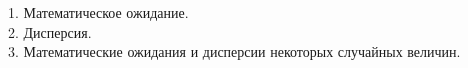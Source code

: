 
1. Математическое ожидание. \\


2. Дисперсия. \\


3. Математические ожидания и дисперсии некоторых случайных величин. \\
